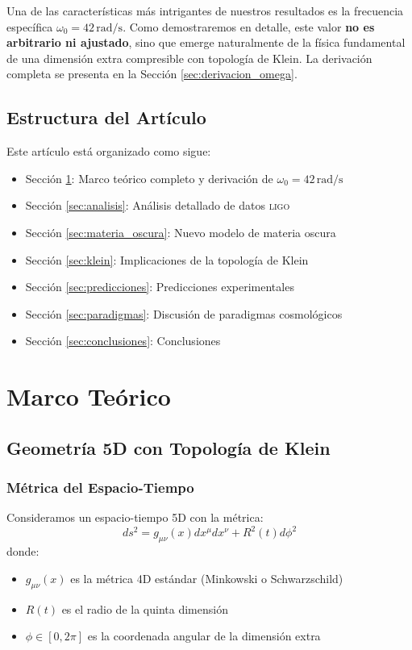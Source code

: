 \documentclass[12pt,a4paper]{article}
\newcommand{\ligo}{\textsc{ligo}}
\begin{document}
Una de las características más intrigantes de nuestros resultados es la frecuencia específica $\omega_0 = 42\,\mathrm{rad/s}$. Como demostraremos en detalle, este valor \textbf{no es arbitrario ni ajustado}, sino que emerge naturalmente de la física fundamental de una dimensión extra compresible con topología de Klein. La derivación completa se presenta en la Sección \ref{sec:derivacion_omega}.

\subsection{Estructura del Artículo}

Este artículo está organizado como sigue:
\begin{itemize}
    \item Sección \ref{sec:marco}: Marco teórico completo y derivación de $\omega_0 = 42\,\mathrm{rad/s}$
    \item Sección \ref{sec:analisis}: Análisis detallado de datos \ligo{}
    \item Sección \ref{sec:materia_oscura}: Nuevo modelo de materia oscura
    \item Sección \ref{sec:klein}: Implicaciones de la topología de Klein
    \item Sección \ref{sec:predicciones}: Predicciones experimentales
    \item Sección \ref{sec:paradigmas}: Discusión de paradigmas cosmológicos
    \item Sección \ref{sec:conclusiones}: Conclusiones
\end{itemize}

\section{Marco Teórico}
\label{sec:marco}

\subsection{Geometría 5D con Topología de Klein}

\subsubsection{Métrica del Espacio-Tiempo}

Consideramos un espacio-tiempo 5D con la métrica:
\begin{equation}
ds^2 = g_{\mu\nu}(x) dx^\mu dx^\nu + R^2(t) d\phi^2
\end{equation}
donde:
\begin{itemize}
    \item $g_{\mu\nu}(x)$ es la métrica 4D estándar (Minkowski o Schwarzschild)
    \item $R(t)$ es el radio de la quinta dimensión
    \item $\phi \in [0, 2\pi]$ es la coordenada angular de la dimensión extra
\end{itemize}
\end{document}
